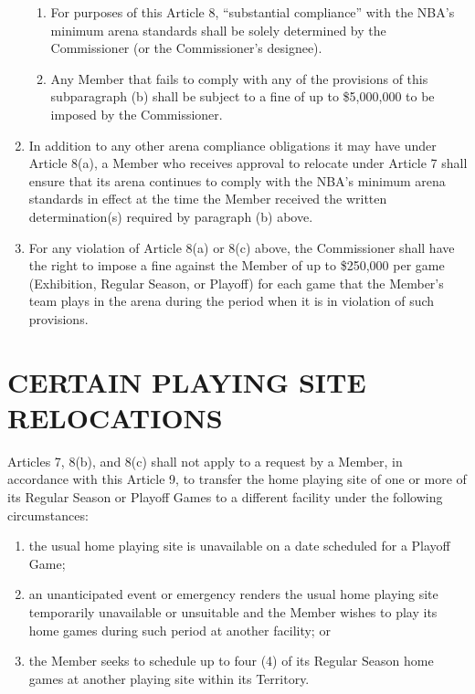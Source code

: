 \documentclass[]{book}
\providecommand{\tightlist}{%
  \setlength{\itemsep}{0pt}\setlength{\parskip}{0pt}}
\begin{document}
\begin{enumerate}
\begin{enumerate}
  \item
    For purposes of this Article 8, ``substantial compliance'' with the NBA's minimum arena standards shall be solely determined by the Commissioner (or the Commissioner's designee).
  \item
    Any Member that fails to comply with any of the provisions of this subparagraph (b) shall be subject to a fine of up to \$5,000,000 to be imposed by the Commissioner.
  \end{enumerate}
\item
  In addition to any other arena compliance obligations it may have under Article 8(a), a Member who receives approval to relocate under Article 7 shall ensure that its arena continues to comply with the NBA's minimum arena standards in effect at the time the Member received the written determination(s) required by paragraph (b) above.
\item
  For any violation of Article 8(a) or 8(c) above, the Commissioner shall have the right to impose a fine against the Member of up to \$250,000 per game (Exhibition, Regular Season, or Playoff) for each game that the Member's team plays in the arena during the period when it is in violation of such provisions.
\end{enumerate}

\hypertarget{certain-playing-site-relocations}{%
\section{CERTAIN PLAYING SITE RELOCATIONS}\label{certain-playing-site-relocations}}

Articles 7, 8(b), and 8(c) shall not apply to a request by a Member, in accordance with this Article 9, to transfer the home playing site of one or more of its Regular Season or Playoff Games to a different facility under the following circumstances:

\begin{enumerate}
\def\labelenumi{(\alph{enumi})}
\tightlist
\item
  the usual home playing site is unavailable on a date scheduled for a Playoff Game;
\item
  an unanticipated event or emergency renders the usual home playing site temporarily unavailable or unsuitable and the Member wishes to play its home games during such period at another facility; or
\item
  the Member seeks to schedule up to four (4) of its Regular Season home games at another playing site within its Territory.
\end{enumerate}
\end{document}
